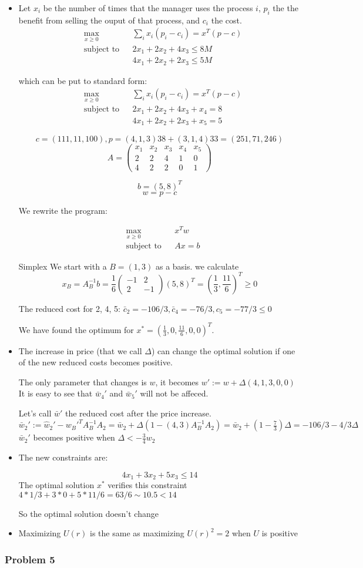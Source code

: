 \documentclass[12pt]{article}
\newcommand{\Q}[1]{\subsubsection*{Problem #1}}
\newcommand{\optimize}[4]{\begin{equation}
\begin{aligned}
& \underset{#1}{\text{#4}}
& & #2 \\
& \text{subject to}
& & #3
\end{aligned}
\end{equation}
}
\newcommand{\maximize}[3]{\optimize{#1}{#2}{#3}{max}}
\begin{document}
\begin{itemize}
\item 

  Let $x_i$ be the number of times that the manager uses the process $i$, $p_i$ the the benefit from selling the ouput of that process, and $c_i$ the cost.
    \maximize{x \geq 0}{ \sum_i x_i (p_i - c_i) = x^T(p-c)}
    {2x_1 + 2x_2 + 4x_3 \leq 8M \\ &&& 4x_1 + 2x_2 + 2x_3 \leq 5M}
which can be put to standard form:
    \maximize{x \geq 0}{ \sum_i x_i (p_i - c_i) = x^T(p-c)}
    {2x_1 + 2x_2 + 4x_3 + x_4 = 8 \\ &&& 4x_1 + 2x_2 + 2x_3 +x_5 = 5}
    
    $$c = (111, 11, 100), p = (4, 1, 3)  38 + (3, 1, 4)  33 = (251,  71, 246)$$
\[A = \left(
\begin{array}{r|r|r|r|r}
x_1&x_2&x_3&x_4&x_5\\
\hline
2&2&4&1&0\\
4&2&2&0&1
\end{array} 
\right) \]

$$b = (5, 8)^T$$
$$ w = p - c$$


We rewrite the program:

    \maximize{x \geq 0}{  x^Tw}{Ax = b}


Simplex
We start with a $B = (1, 3)$ as a basis.
we calculate 
\[ x_B = A_B^{-1} b = \frac{1}{6} 
\left(\begin{array}{cc}-1 & 2 \\ 2 & -1\end{array}\right)
(5, 8)^T = (\frac{1}{3}, \frac{11}{6})^T \geq 0
\]

The reduced cost for 2, 4, 5:
$\bar c_2 = -106/3, \bar c_4 = -76/3, c_5 = -77/3 \leq 0$

We have found the optimum for $x^* = (\frac{1}{3}, 0, \frac{11}{6}, 0, 0)^T$.

\item
The increase in price (that we call $\Delta$) can change the optimal solution if one of the new reduced costs becomes positive.

The only parameter that changes is $w$, it becomes $w' := w + \Delta (4, 1, 3, 0, 0)$
It is easy to see that $\bar w_4'$ and $\bar w_5'$  will not be affeced.

Let's call $\bar w'$ the reduced cost after the price increase.
$\bar w_2' := \hat w_2' - w_B'^T A_B^{-1} A_2 =  \bar w_2 + \Delta (1 - (4, 3) A_B^{-1} A_2) = \bar w_2 + (1 - \frac{7}{3}) \Delta = -106/3 - 4/3 \Delta$
$\bar w_2 '$ becomes positive when $\Delta < -\frac{3}{4}w_2$


\item
The new constraints are:

$$4x_1 + 3x_2 + 5x_3 \leq 14$$
The optimal solution $x^*$ verifies this constraint
$4 * 1/3 + 3*0 + 5*11/6 = 63/6 \sim 10.5 < 14$

So the optimal solution doesn't change

\item Maximizing $U(r)$ is the same as maximizing $U(r)^2 = 2$ when $U$ is positive

\end{itemize}


\Q{5}
\end{document}
